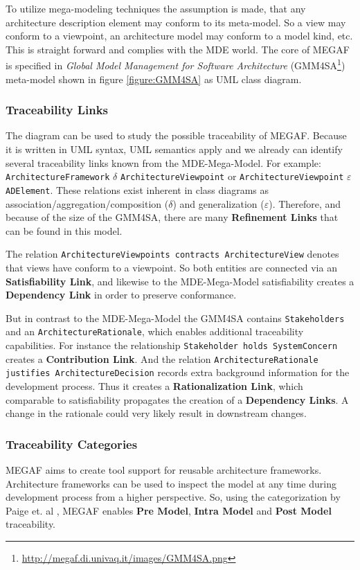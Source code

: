\documentclass[runningheads,a4paper]{llncs}
\begin{document}
To utilize mega-modeling techniques the assumption is made, that any architecture description element may conform to its meta-model. 
So a view may conform to a viewpoint, an architecture model may conform to a model kind, etc. This is straight forward and complies with the MDE world. 
The core of MEGAF is specified in \textit{Global Model Management for Software Architecture} (GMM4SA\footnote{\url{http://megaf.di.univaq.it/images/GMM4SA.png}}) meta-model shown in figure \ref{figure:GMM4SA} as UML class diagram. 

\subsubsection{Traceability Links}
The diagram can be used to study the possible traceability of MEGAF. Because it is written in UML syntax, UML semantics apply and we already can identify several traceability links known from the MDE-Mega-Model. 
For example: {\small \texttt{ArchitectureFramework} $\delta$ \texttt{ArchitectureViewpoint}} or {\small \texttt{ArchitectureViewpoint} $\varepsilon$ \texttt{ADElement}}.
These relations exist inherent in class diagrams as association/aggregation/composition ($\delta$) and generalization ($\varepsilon$). 
Therefore, and because of the size of the GMM4SA, there are many \textbf{Refinement Links} that can be found in this model.

The relation \texttt{ArchitectureViewpoints contracts ArchitectureView} denotes that views have conform to a viewpoint.
So both entities are connected via an \textbf{Satisfiability Link}, and likewise to the MDE-Mega-Model satisfiability creates a \textbf{Dependency Link} in order to preserve conformance.

But in contrast to the MDE-Mega-Model the GMM4SA contains \texttt{Stakeholders} and an \texttt{ArchitectureRationale}, which enables additional traceability capabilities.
For instance the relationship \texttt{Stakeholder holds SystemConcern} creates a \textbf{Contribution Link}.
And the relation \texttt{ArchitectureRationale justifies ArchitectureDecision} records extra background information for the development process.
Thus it creates a \textbf{Rationalization Link}, which comparable to satisfiability propagates the creation of a \textbf{Dependency Links}.
A change in the rationale could very likely result in downstream changes.


\subsubsection{Traceability Categories}
MEGAF aims to create tool support for reusable architecture frameworks. 
Architecture frameworks can be used to inspect the model at any time during development process from a higher perspective.
So, using the categorization by Paige et. al \cite{PaigeEtAl}, MEGAF enables \textbf{Pre Model}, \textbf{Intra Model} and \textbf{Post Model} traceability.
\end{document}
